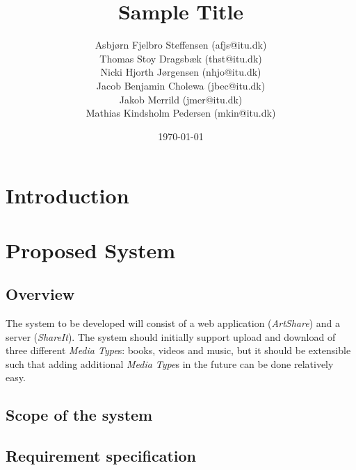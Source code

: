 \documentclass{report}
\title{Sample Title}
\date{\today}
\author{Asbj\o rn Fjelbro Steffensen (afjs@itu.dk)\\ Thomas Stoy Dragsb\ae k (thst@itu.dk)\\ Nicki Hjorth J\o rgensen (nhjo@itu.dk)\\ Jacob Benjamin Cholewa (jbec@itu.dk)\\ Jakob Merrild (jmer@itu.dk)\\ Mathias Kindsholm Pedersen (mkin@itu.dk)}
\begin{document}

\listoftodos[TODO]

\newpage
\tableofcontents

\chapter{Introduction}



\newpage


\chapter{Proposed System}

\section{Overview}
The system to be developed will consist of a web application (\textit{ArtShare}) and a server (\textit{ShareIt}). The system should initially support upload and download of three different \textit{Media Type}s: books, videos and music, but it should be extensible such that adding additional \textit{Media Type}s in the future can be done relatively easy.


\section{Scope of the system}


\section{Requirement specification}
\end{document}
